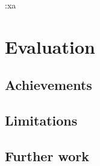 :xa


\section{Evaluation}
    \label{sec:evaluation}
\subsection{Achievements}
\subsection{Limitations}
\subsection{Further work}
